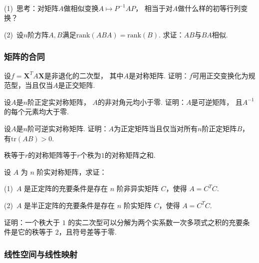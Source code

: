 \bigskip

\begin{example}
    ~

    (1)~思考：对矩阵$A$做相似变换$A \mapsto P^{-1}AP$，
    相当于对$A$做什么样的初等行列变换？

    (2)~设$n$阶方阵$A,B$满足$\mathrm{rank}(ABA) = \mathrm{rank}(B)$.
    求证：$AB$与$BA$相似.
\end{example}

\bigskip


\subsubsection{矩阵的合同}

\begin{example}
    设$f = \bm{X}^T A \bm{X}$是非退化的二次型，
    其中$A$是对称矩阵.
    证明：$f$可用正交变换化为规范型，当且仅当$A$是正交矩阵.
\end{example}

\begin{example}
    设$A$是$n$阶正定实对称矩阵，
    $A$的非对角元均小于零.
    证明：$A$是可逆矩阵，
    且$A^{-1}$的每个元素均大于零.
\end{example}

\begin{example}
    设$A$是$n$阶可逆实对称矩阵.
    证明：$A$为正定矩阵当且仅当对所有$n$阶正定矩阵$B$，
    有$\mathrm{tr}(AB) > 0$.
\end{example}

\begin{example}
    秩等于$r$的对称矩阵等于$r$个秩为$1$的对称矩阵之和.
\end{example}

\begin{example}
    设 $A$ 为 $n$ 阶实对称矩阵，求证：

    (1)~$A$ 是正定阵的充要条件是存在 $n$ 阶非异实矩阵 $C$，使得 $A = C^T C$.
    
    (2)~$A$ 是半正定阵的充要条件是存在 $n$ 阶实矩阵 $C$，使得 $A = C^T C$.
\end{example}

\begin{example}
    证明：一个秩大于 $1$ 的实二次型可以分解为两个实系数一次多项式之积的充要条件是它的秩等于 $2$，且符号差等于零.
\end{example}

\bigskip

\subsubsection{线性空间与线性映射}

